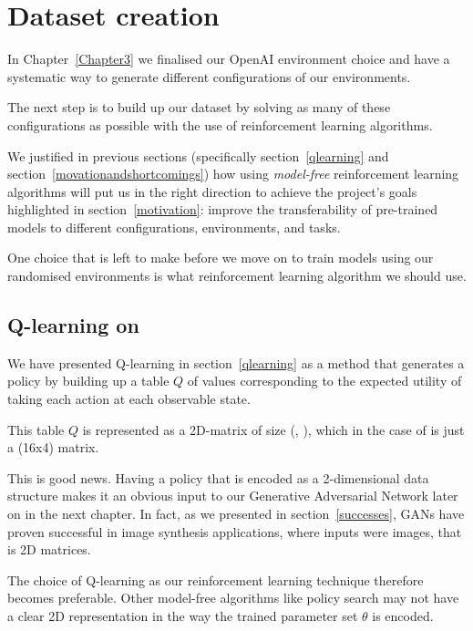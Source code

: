
\chapter{Dataset creation}
\label{Chapter4}

In Chapter~\ref{Chapter3} we finalised our OpenAI environment choice and have a systematic way to generate different configurations of our environments.

The next step is to build up our dataset by solving as many of these configurations as possible with the use of reinforcement learning algorithms.

We justified in previous sections (specifically section~\ref{qlearning} and section~\ref{movationandshortcomings}) how using \emph{model-free} reinforcement learning algorithms will put us in the right direction to achieve the project's goals highlighted in section~\ref{motivation}: improve the transferability of pre-trained models to different configurations, environments, and tasks.

One choice that is left to make before we move on to train models using our randomised environments is what reinforcement learning algorithm we should use.


\section{Q-learning on }
We have presented Q-learning in section~\ref{qlearning} as a method that generates a policy by building up a table $Q$ of values corresponding to the expected utility of taking each action at each observable state.

This table $Q$ is represented as a 2D-matrix of size (, ), which in the case of  is just a (16x4) matrix.

This is good news. Having a policy that is encoded as a 2-dimensional data structure makes it an obvious input to our Generative Adversarial Network later on in the next chapter. In fact, as we presented in section~\ref{successes}, GANs have proven successful in image synthesis applications, where inputs were images, that is 2D matrices.

The choice of Q-learning as our reinforcement learning technique therefore becomes preferable. Other model-free algorithms like policy search may not have a clear 2D representation in the way the trained parameter set $\theta$ is encoded.

